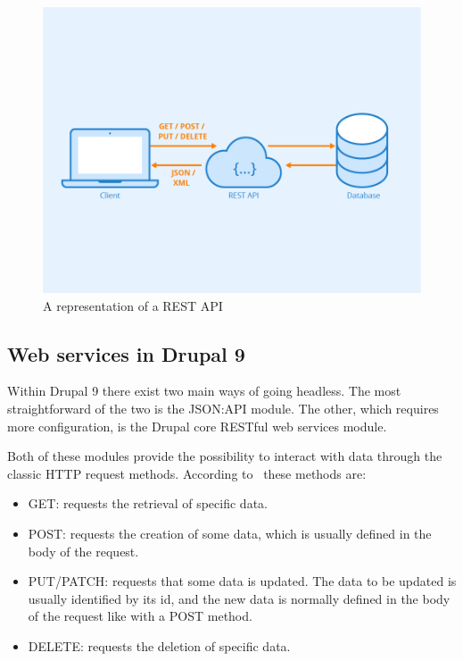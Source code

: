 \begin{figure}
	\centering
	\includegraphics{./img/Rest-API.png}
	\caption[REST API]{A representation of a REST API ~\autocite{Seobility}}
\end{figure}


\subsection{Web services in Drupal 9}
Within Drupal 9 there exist two main ways of going headless. The most straightforward of the two is the JSON:API module. The other, which requires more configuration, is the Drupal core RESTful web services module. 

Both of these modules provide the possibility to interact with data through the classic HTTP request methods. According to~\autocite{Wilde2011} these methods are: 

\begin{itemize}
	\item GET: requests the retrieval of specific data.
	\item POST: requests the creation of some data, which is usually defined in the body of the request.
	\item PUT/PATCH: requests that some data is updated. The data to be updated is usually identified by its id, and the new data is normally defined in the body of the request like with a POST method.
	\item DELETE: requests the deletion of specific data.
\end{itemize}


